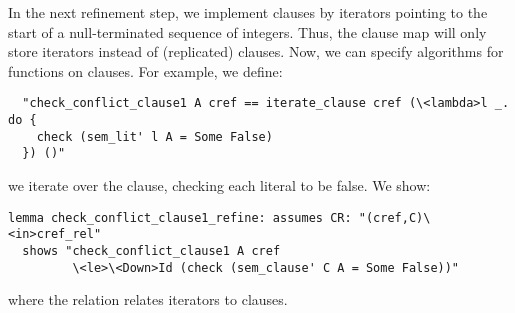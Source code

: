\documentclass[smallcondensed]{svjour3}     %
\makeatletter
\newcommand{\isai}{\lstinline[language=isabelle,basicstyle=\normalsize\ttfamily\slshape]}
\renewcommand\lstinline[1][]{%
  \leavevmode
  \ifmmode\expandafter\hbox\fi\bgroup
    \def\lst@boxpos{b}%
    \lsthk@PreSet\lstset{flexiblecolumns,#1}%
    \lsthk@TextStyle
    \@ifnextchar\bgroup{\afterassignment\lst@InlineG \let\@let@token}%
                       \lstinline@}
\makeatother
\begin{document}
In the next refinement step, we implement clauses by iterators pointing to the start of a null-terminated sequence of integers.
Thus, the clause map will only store iterators instead of (replicated) clauses. 
Now, we can specify algorithms for functions on clauses. For example, we define:
\begin{lstlisting}
  "check_conflict_clause1 A cref == iterate_clause cref (\<lambda>l _. do {
    check (sem_lit' l A = Some False)
  }) ()"
\end{lstlisting}
\ie we iterate over the clause, checking each literal to be false. We show:
\begin{lstlisting}
lemma check_conflict_clause1_refine: assumes CR: "(cref,C)\<in>cref_rel"
  shows "check_conflict_clause1 A cref 
         \<le>\<Down>Id (check (sem_clause' C A = Some False))"
\end{lstlisting}
where the relation \isai{cref_rel} relates iterators to clauses.
\end{document}
